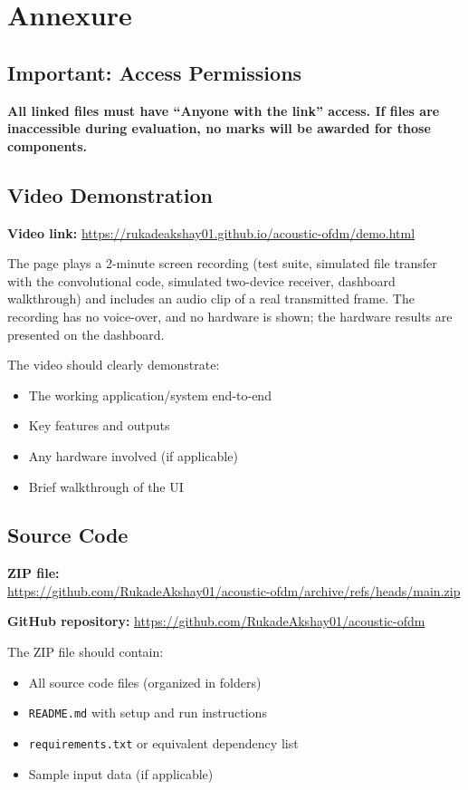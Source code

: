 \documentclass[11pt,a4paper]{report}
\begin{document}
\chapter{Annexure}

\section*{Important: Access Permissions}
\textbf{All linked files must have ``Anyone with the link'' access. If files are inaccessible during evaluation, no marks will be awarded for those components.}

\section{Video Demonstration}
\textbf{Video link:} \url{https://rukadeakshay01.github.io/acoustic-ofdm/demo.html}

The page plays a 2-minute screen recording (test suite, simulated file transfer with
the convolutional code, simulated two-device receiver, dashboard walkthrough) and
includes an audio clip of a real transmitted frame. The recording has no voice-over,
and no hardware is shown; the hardware results are presented on the dashboard.

The video should clearly demonstrate:
\begin{itemize}
    \item The working application/system end-to-end
    \item Key features and outputs
    \item Any hardware involved (if applicable)
    \item Brief walkthrough of the UI
\end{itemize}

\section{Source Code}
\textbf{ZIP file:}\\
\url{https://github.com/RukadeAkshay01/acoustic-ofdm/archive/refs/heads/main.zip}

\textbf{GitHub repository:} \url{https://github.com/RukadeAkshay01/acoustic-ofdm}

The ZIP file should contain:
\begin{itemize}
    \item All source code files (organized in folders)
    \item \texttt{README.md} with setup and run instructions
    \item \texttt{requirements.txt} or equivalent dependency list
    \item Sample input data (if applicable)
\end{itemize}
\end{document}
